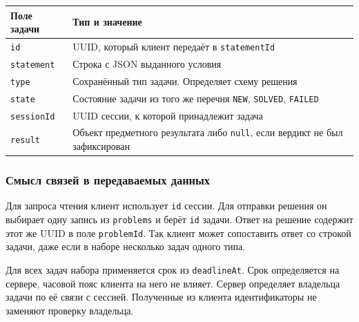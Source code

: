 \documentclass[12pt,a4paper]{article}
\begin{document}
{\def\LTcaptype{none} %
\begin{longtable}[]{@{}
  >{\raggedright\arraybackslash}p{}
  >{\raggedright\arraybackslash}p{}@{}}
\toprule\noalign{}
\begin{minipage}[b]{\linewidth}\raggedright
Поле задачи
\end{minipage} & \begin{minipage}[b]{\linewidth}\raggedright
Тип и значение
\end{minipage} \\
\midrule\noalign{}
\endhead
\bottomrule\noalign{}
\endlastfoot
\texttt{id} & UUID, который клиент передаёт в \texttt{statementId} \\
\texttt{statement} & Строка с JSON выданного условия \\
\texttt{type} & Сохранённый тип задачи. Определяет схему решения \\
\texttt{state} & Состояние задачи из того же перечня \texttt{NEW}, \texttt{SOLVED}, \texttt{FAILED} \\
\texttt{sessionId} & UUID сессии, к которой принадлежит задача \\
\texttt{result} & Объект предметного результата либо \texttt{null}, если вердикт не был зафиксирован \\
\end{longtable}
}

\subsubsection{Смысл связей в передаваемых данных}\label{ux441ux43cux44bux441ux43b-ux441ux432ux44fux437ux435ux439-ux432-ux43fux435ux440ux435ux434ux430ux432ux430ux435ux43cux44bux445-ux434ux430ux43dux43dux44bux445}

\hypertarget{смысл-связей-в-передаваемых-данных}{}

Для запроса чтения клиент использует \texttt{id} сессии. Для отправки решения он выбирает одну запись из \texttt{problems} и берёт \texttt{id} задачи. Ответ на решение содержит этот же UUID в поле \texttt{problemId}. Так клиент может сопоставить ответ со строкой задачи, даже если в наборе несколько задач одного типа.

Для всех задач набора применяется срок из \texttt{deadlineAt}. Срок определяется на сервере, часовой пояс клиента на него не влияет. Сервер определяет владельца задачи по её связи с сессией. Полученные из клиента идентификаторы не заменяют проверку владельца.
\end{document}
